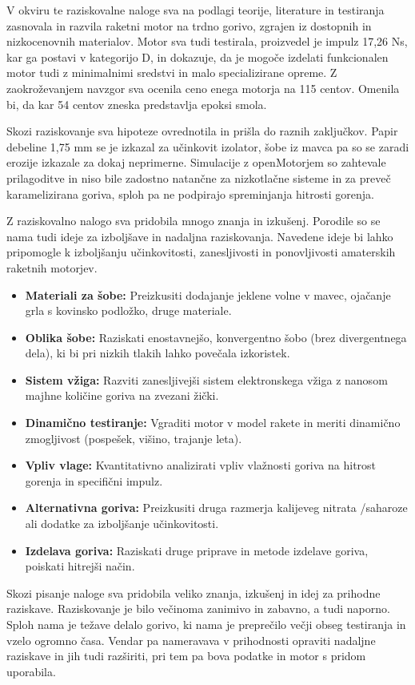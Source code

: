 \documentclass[titlepage, a4paper, twoside, final, 12pt]{article}
\begin{document}
V okviru te raziskovalne naloge sva na podlagi teorije, literature in testiranja zasnovala in razvila raketni motor na trdno gorivo, zgrajen iz dostopnih in nizkocenovnih materialov. Motor sva tudi testirala, proizvedel je impulz 17,26 Ns, kar ga postavi v kategorijo D, in dokazuje, 
da je mogoče izdelati funkcionalen motor tudi z  minimalnimi sredstvi in malo specializirane opreme. Z zaokroževanjem navzgor sva ocenila ceno enega motorja na 115 centov. Omenila bi, da kar 54 centov zneska predstavlja epoksi smola.

Skozi raziskovanje sva hipoteze ovrednotila in prišla do raznih zaključkov. Papir debeline 1,75 mm se je izkazal za učinkovit izolator, šobe iz mavca pa so se zaradi erozije izkazale za dokaj neprimerne.
Simulacije z openMotorjem so zahtevale prilagoditve in niso bile zadostno natančne za nizkotlačne sisteme in za preveč karamelizirana goriva, sploh pa ne podpirajo spreminjanja hitrosti gorenja.

Z raziskovalno nalogo sva pridobila mnogo znanja in izkušenj. Porodile so se nama tudi ideje za izboljšave in nadaljna raziskovanja.
Navedene ideje bi lahko pripomogle k izboljšanju učinkovitosti, zanesljivosti in ponovljivosti amaterskih raketnih motorjev. 

\begin{itemize}
    \item \textbf{Materiali za šobe:} Preizkusiti dodajanje jeklene volne v mavec, ojačanje grla s kovinsko podložko, druge materiale.
    \item \textbf{Oblika šobe:} Raziskati enostavnejšo, konvergentno šobo (brez divergentnega dela), ki bi pri nizkih tlakih lahko povečala izkoristek.
    \item \textbf{Sistem vžiga:} Razviti zanesljivejši sistem elektronskega vžiga z nanosom majhne količine goriva na zvezani žički.
    \item \textbf{Dinamično testiranje:} Vgraditi motor v model rakete in meriti dinamično zmogljivost (pospešek, višino, trajanje leta).
    \item \textbf{Vpliv vlage:} Kvantitativno analizirati vpliv vlažnosti goriva na hitrost gorenja in specifični impulz.
    \item \textbf{Alternativna goriva:} Preizkusiti druga razmerja kalijeveg nitrata /saharoze ali dodatke za izboljšanje učinkovitosti.
	\item \textbf{Izdelava goriva:} Raziskati druge priprave in metode izdelave goriva, poiskati hitrejši način.
\end{itemize}

		Skozi pisanje naloge sva pridobila veliko znanja, izkušenj in idej za prihodne raziskave. Raziskovanje je bilo večinoma zanimivo in zabavno, a tudi naporno.
		Sploh nama je težave delalo gorivo, ki nama je preprečilo večji obseg testiranja in vzelo ogromno časa.
		Vendar pa nameravava v prihodnosti opraviti nadaljne raziskave in jih tudi razširiti, pri tem pa bova podatke in motor s pridom uporabila.

	\printbibliography
	[
	heading=bibintoc,
	title={Literatura}
	]
\end{document}
